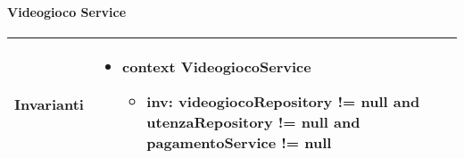 \paragraph{Videogioco Service}
\small\begin{tabular}{|| l | p{28em} ||} 
	\hline
	Invarianti & \begin{itemize}
		\item \textbf{context} VideogiocoService
		\begin{itemize}
			\item[ ] \textbf{inv:} videogiocoRepository != null and utenzaRepository != null and pagamentoService != null
		\end{itemize}
	\end{itemize}\\
	\hline
\end{tabular}

